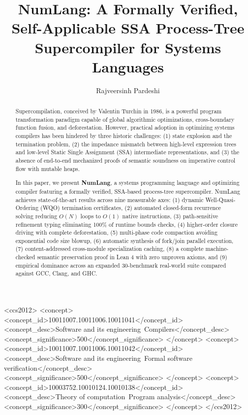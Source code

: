 \documentclass[sigplan,screen]{acmart}
\begin{document}
\title[NumLang: Verified SSA Process-Tree Supercompiler]{NumLang: A Formally Verified, Self-Applicable SSA Process-Tree Supercompiler for Systems Languages}

\author{Rajveersinh Pardeshi}

\begin{abstract}
Supercompilation, conceived by Valentin Turchin in 1986, is a powerful program transformation paradigm capable of global algorithmic optimizations, cross-boundary function fusion, and deforestation. However, practical adoption in optimizing systems compilers has been hindered by three historic challenges: (1) state explosion and the termination problem, (2) the impedance mismatch between high-level expression trees and low-level Static Single Assignment (SSA) intermediate representations, and (3) the absence of end-to-end mechanized proofs of semantic soundness on imperative control flow with mutable heaps.

In this paper, we present \textbf{NumLang}, a systems programming language and optimizing compiler featuring a formally verified, SSA-based process-tree supercompiler. NumLang achieves state-of-the-art results across nine measurable axes: (1) dynamic Well-Quasi-Ordering (WQO) termination certificates, (2) automated closed-form recurrence solving reducing $O(N)$ loops to $O(1)$ native instructions, (3) path-sensitive refinement typing eliminating 100\% of runtime bounds checks, (4) higher-order closure driving with complete deforestation, (5) multi-phase code compaction avoiding exponential code size blowup, (6) automatic synthesis of fork/join parallel execution, (7) content-addressed cross-module specialization caching, (8) a complete machine-checked semantic preservation proof in Lean 4 with zero unproven axioms, and (9) empirical dominance across an expanded 30-benchmark real-world suite compared against GCC, Clang, and GHC.
\end{abstract}

\begin{CCSXML}
<ccs2012>
   <concept>
       <concept_id>10011007.10011006.10011041</concept_id>
       <concept_desc>Software and its engineering~Compilers</concept_desc>
       <concept_significance>500</concept_significance>
   </concept>
   <concept>
       <concept_id>10011007.10011006.10011042</concept_id>
       <concept_desc>Software and its engineering~Formal software verification</concept_desc>
       <concept_significance>500</concept_significance>
   </concept>
   <concept>
       <concept_id>10003752.10010124.10010138</concept_id>
       <concept_desc>Theory of computation~Program analysis</concept_desc>
       <concept_significance>300</concept_significance>
   </concept>
</ccs2012>
\end{CCSXML}
\end{document}
